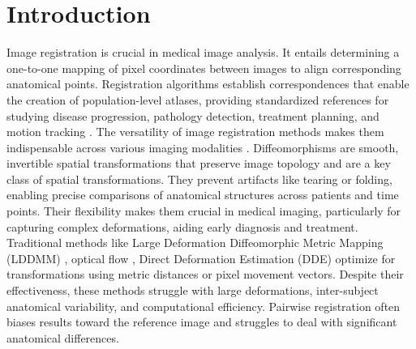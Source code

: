 \section{Introduction}
Image registration is crucial in medical image analysis. It entails determining a one-to-one mapping of pixel coordinates between images to align corresponding anatomical points. Registration algorithms establish correspondences that enable the creation of population-level atlases, providing standardized references for studying disease progression, pathology detection, treatment planning, and motion tracking \cite{suganyadevi2022review,zachiu2020anatomically,binte2020spatiotemporal, viergever2016survey}. The versatility of image registration methods makes them indispensable across various imaging modalities \cite{huang2022reconet}.
Diffeomorphisms are smooth, invertible spatial transformations that preserve image topology and are a key class of spatial transformations. They prevent artifacts like tearing or folding, enabling precise comparisons of anatomical structures across patients and time points. Their flexibility makes them crucial in medical imaging, particularly for capturing complex deformations, aiding early diagnosis and treatment. 
%
Traditional methods like Large Deformation Diffeomorphic Metric Mapping (LDDMM) \cite{beg2005computing,joshi2000landmark}, optical flow \cite{zhai2021optical},  Direct Deformation Estimation (DDE) \cite{boyle2019regularization} optimize for transformations using metric distances or pixel movement vectors. Despite their effectiveness, these methods struggle with large deformations, inter-subject anatomical variability, and computational efficiency. Pairwise registration often biases results toward the reference image and struggles to deal with significant anatomical differences.

